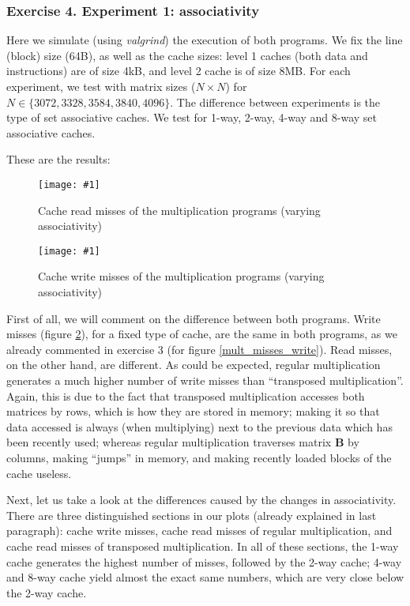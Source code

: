 \documentclass{article}
\newcommand{\myFigure}[4]{%
    \begin{figure}[!ht]
        \texttt{[image: \#1]}
        \centering
        \caption{#2}
        \label{#3}
    \end{figure}
}
\begin{document}
\subsubsection*{Exercise 4. Experiment 1: associativity}

Here we simulate (using \emph{valgrind}) the execution of both programs. We fix the line (block) size (64B), as well as the cache sizes: level 1 caches (both data and instructions) are of size 4kB, and level 2 cache is of size 8MB. For each experiment, we test with matrix sizes ($N\times N$) for $N\in\{3072,3328,3584,3840,4096\}$. The difference between experiments is the type of set associative caches. We test for 1-way, 2-way, 4-way and 8-way set associative caches.

These are the results:

\myFigure{../material_P3/protect_out4/asoc/p2/4096/lectura.png}{Cache read misses of the multiplication programs (varying associativity)}{asoc_lectura}{0.55}

\myFigure{../material_P3/protect_out4/asoc/p2/4096/escritura.png}{Cache write misses of the multiplication programs (varying associativity)}{asoc_escritura}{0.55}

First of all, we will comment on the difference between both programs. Write misses (figure \ref{asoc_escritura}), for a fixed type of cache, are the same in both programs, as we already commented in exercise 3 (for figure \ref{mult_misses_write}). Read misses, on the other hand, are different. As could be expected, regular multiplication generates a much higher number of write misses than ``transposed multiplication''. Again, this is due to the fact that transposed multiplication accesses both matrices by rows, which is how they are stored in memory; making it so that data accessed is always (when multiplying) next to the previous data which has been recently used; whereas regular multiplication traverses matrix $\mathbf{B}$ by columns, making ``jumps'' in memory, and making recently loaded blocks of the cache useless.

Next, let us take a look at the differences caused by the changes in associativity. There are three distinguished sections in our plots (already explained in last paragraph): cache write misses, cache read misses of regular multiplication, and cache read misses of transposed multiplication. In all of these sections, the 1-way cache generates the highest number of misses, followed by the 2-way cache; 4-way and 8-way cache yield almost the exact same numbers, which are very close below the 2-way cache. 
\end{document}
